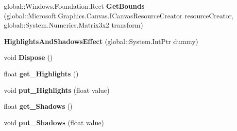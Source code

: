 \begin{DoxyCompactItemize}
global\+::\+Windows.\+Foundation.\+Rect {\bfseries Get\+Bounds} (global\+::\+Microsoft.\+Graphics.\+Canvas.\+I\+Canvas\+Resource\+Creator resource\+Creator, global\+::\+System.\+Numerics.\+Matrix3x2 transform)
\item 
\mbox{\label{class_microsoft_1_1_graphics_1_1_canvas_1_1_effects_1_1_highlights_and_shadows_effect_a49c24ba8cbbe709553a047ed0a174cd5}} 
{\bfseries Highlights\+And\+Shadows\+Effect} (global\+::\+System.\+Int\+Ptr dummy)
\item 
\mbox{\label{class_microsoft_1_1_graphics_1_1_canvas_1_1_effects_1_1_highlights_and_shadows_effect_a46bf03f4381128bc91a8897ab8420b8e}} 
void {\bfseries Dispose} ()
\item 
\mbox{\label{class_microsoft_1_1_graphics_1_1_canvas_1_1_effects_1_1_highlights_and_shadows_effect_ad3f72cfd6e6d3034e5bfe3baa01927c1}} 
float {\bfseries get\+\_\+\+Highlights} ()
\item 
\mbox{\label{class_microsoft_1_1_graphics_1_1_canvas_1_1_effects_1_1_highlights_and_shadows_effect_a3be5bf341f60d60d01dde1546fb07565}} 
void {\bfseries put\+\_\+\+Highlights} (float value)
\item 
\mbox{\label{class_microsoft_1_1_graphics_1_1_canvas_1_1_effects_1_1_highlights_and_shadows_effect_a9f62693f3bc1030624ce81336333d4e3}} 
float {\bfseries get\+\_\+\+Shadows} ()
\item 
\mbox{\label{class_microsoft_1_1_graphics_1_1_canvas_1_1_effects_1_1_highlights_and_shadows_effect_a965bd7d4f4dd2b74faec26e71917af63}} 
void {\bfseries put\+\_\+\+Shadows} (float value)
\item 
\mbox{\label{class_microsoft_1_1_graphics_1_1_canvas_1_1_effects_1_1_highlights_and_shadows_effect_a88a19019dd463dda2e0db329100c717a}} 

\end{DoxyCompactItemize}
